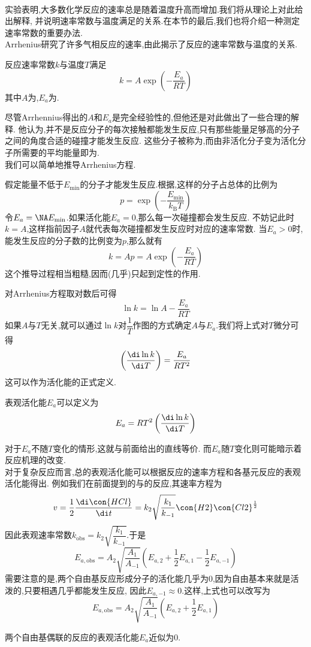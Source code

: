 \documentclass{ctexart}
\begin{document}
\pagestyle{plain}
\noindent{}\vspace{15pt}\\
\indent 实验表明,大多数化学反应的速率总是随着温度升高而增加.我们将从理论上对此给出解释,%
并说明速率常数与温度满足的关系.在本节的最后,我们也将介绍一种测定速率常数的重要办法.\vspace{12pt}\\
\indent Arrhenius研究了许多气相反应的速率,由此揭示了反应的速率常数与温度的关系.
\begin{theorem}[7E.1.1 Arrhenius方程]
    反应速率常数$k$与温度$T$满足
    \[k=A\exp\left(-\dfrac{E_a}{RT}\right)\]
    其中$A$为,$E_a$为.
\end{theorem}
尽管Arrhennius得出的$A$和$E_a$是完全经验性的,但他还是对此做出了一些合理的解释.%
他认为,并不是反应分子的每次接触都能发生反应,只有那些能量足够高的分子之间的角度合适的碰撞才能发生反应.%
这些分子被称为,而由非活化分子变为活化分子所需要的平均能量即为.\\
\indent 我们可以简单地推导Arrhenius方程.
\begin{derivation}
    假定能量不低于$E_{\min}$的分子才能发生反应.根据,这样的分子占总体的比例为
    \[p=\exp\left(-\dfrac{E_{\min}}{k_\text{B}T}\right)\]
    令$E_a=\NA E_{\min}$.如果活化能$E_a=0$,那么每一次碰撞都会发生反应.%
    不妨记此时$k=A$,这样指前因子$A$就代表每次碰撞都发生反应时对应的速率常数.%
    当$E_a>0$时,能发生反应的分子数的比例变为$p$,那么就有
    \[k=Ap=A\exp\left(-\dfrac{E_a}{RT}\right)\]
    这个推导过程相当粗糙,因而(几乎)只起到定性的作用.
\end{derivation}
对Arrhenius方程取对数后可得
\[\ln k=\ln A-\dfrac{E_a}{RT}\]
如果$A$与$T$无关,就可以通过$\ln k$对$\dfrac1T$作图的方式确定$A$与$E_a$.我们将上式对$T$微分可得
\[\left(\dfrac{\di\ln k}{\di T}\right)=\dfrac{E_a}{RT^2}\]
这可以作为活化能的正式定义.
\begin{definition}[7E.1.2 表观活化能]
    表观活化能$E_a$可以定义为
    \[E_a=RT^2\left(\dfrac{\di\ln k}{\di T}\right)\]

\end{definition}
对于$E_a$不随$T$变化的情形,这就与前面给出的直线等价.%
而$E_a$随$T$变化则可能暗示着反应机理的改变.\\
\indent 对于复杂反应而言,总的表观活化能可以根据反应的速率方程和各基元反应的表观活化能得出.%
例如我们在前面提到的与的反应,其速率方程为
\[v=\dfrac{1}{2}\dfrac{\di\con{HCl}}{\di t}=k_2\sqrt{\dfrac{k_1}{k_{-1}}}\con{H2}\con{Cl2}^{\frac12}\]
因此表观速率常数$k_{\text{obs}}=k_2\sqrt{\dfrac{k_1}{k_{-1}}}$.于是
\[E_{a,\text{obs}}=A_2\sqrt{\dfrac{A_1}{A_{-1}}}\left(E_{a,2}+\dfrac12E_{a,1}-\dfrac12E_{a,-1}\right)\]
需要注意的是,两个自由基反应形成分子的活化能几乎为$0$,因为自由基本来就是活泼的,只要相遇几乎都能发生反应,%
因此$E_{a,-1}\approx0$.这样,上式也可以改写为
\[E_{a,\text{obs}}=A_2\sqrt{\dfrac{A_1}{A_{-1}}}\left(E_{a,2}+\dfrac12E_{a,1}\right)\]
\begin{theorem}[7E.1.3 自由基偶联反应的表观活化能]
    两个自由基偶联的反应的表观活化能$E_a$近似为$0$.
\end{theorem}
\end{document}
